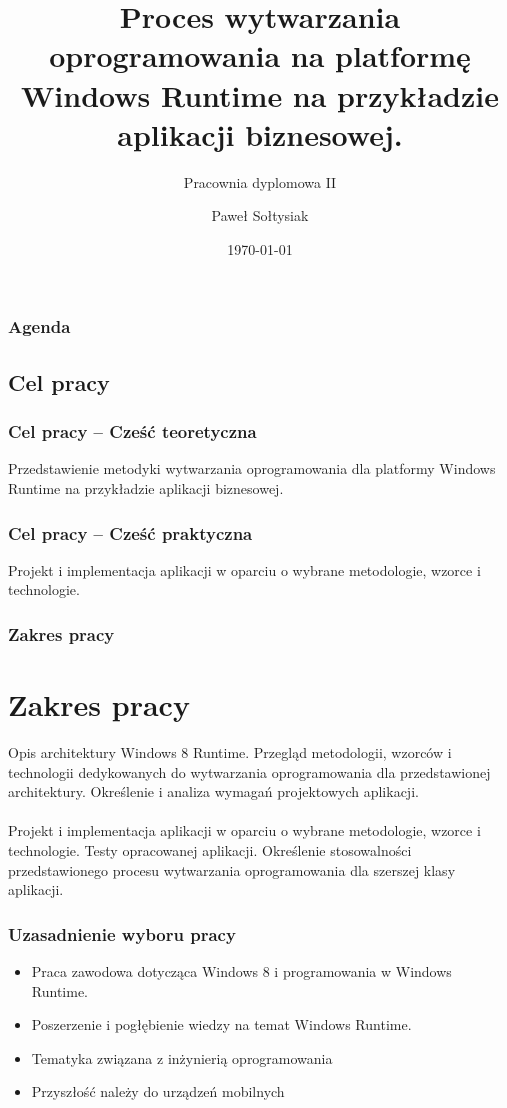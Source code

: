 \documentclass{beamer}
\title{Proces wytwarzania oprogramowania na platformę Windows Runtime na przykładzie aplikacji biznesowej.}
\subtitle{Pracownia dyplomowa II}
\author{Paweł Sołtysiak}
\institute{Opiekun pracy: dr inż.  Witold Maćków\\Kierownik Katedry: prof. dr hab. inż. Włodzimierz Bielecki}
\date{\today}
\begin{document}
\begin{frame}
\titlepage
\end{frame} 

\begin{frame}
\frametitle{Agenda} 
\tableofcontents
\end{frame} 

\begin{frame}
\section{Cel pracy}
\frametitle{Cel pracy -- Cześć teoretyczna} 
Przedstawienie metodyki wytwarzania oprogramowania dla platformy Windows Runtime na przykładzie aplikacji biznesowej.
\end{frame}

\begin{frame}
\frametitle{Cel pracy -- Cześć praktyczna} 
Projekt i implementacja aplikacji w oparciu o wybrane metodologie, wzorce i technologie.
\end{frame}

\begin{frame}
\frametitle{Zakres pracy} 
\section{Zakres pracy}
Opis architektury Windows 8 Runtime. Przegląd metodologii, wzorców i technologii dedykowanych do wytwarzania oprogramowania dla przedstawionej architektury. Określenie i analiza wymagań projektowych aplikacji.\\
~\\
Projekt i implementacja aplikacji w oparciu o wybrane metodologie, wzorce i technologie. Testy opracowanej aplikacji. Określenie stosowalności przedstawionego procesu wytwarzania oprogramowania dla szerszej klasy aplikacji.
\end{frame}


\begin{frame}
\frametitle{Uzasadnienie wyboru pracy} 
\begin{itemize}
\item Praca zawodowa dotycząca Windows 8 i programowania w Windows Runtime.
\item Poszerzenie i pogłębienie wiedzy na temat Windows Runtime.
\item Tematyka związana z inżynierią oprogramowania
\item Przyszłość należy do urządzeń mobilnych 
\end{itemize}
\end{frame}
\end{document}
